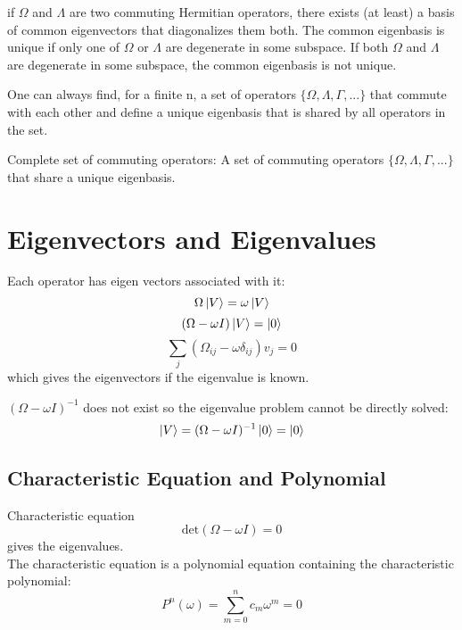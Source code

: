 \begin{theorem}
	if $\Omega$ and $\Lambda$ are two commuting Hermitian operators, there exists (at least) a basis of common eigenvectors that 
	diagonalizes them both.  The common eigenbasis is unique if only one of $\Omega$ or $\Lambda$ are degenerate in some subspace.  
	If both $\Omega$ and $\Lambda$ are	degenerate in some subspace, the common eigenbasis is not unique.
\end{theorem}

\begin{theorem}
	One can always find, for a finite n, a set of operators $\{\Omega, \Lambda, \Gamma, ...\}$ that commute with each other and define
	a unique eigenbasis that is shared by all operators in the set.
\end{theorem}

\begin{definition}{Complete set of commuting operators:}
	A set of commuting operators $\{\Omega, \Lambda, \Gamma, ...\}$ that share a unique eigenbasis.
\end{definition}




\section{Eigenvectors and Eigenvalues}

Each operator has eigen vectors associated with it:
\begin{equation}
	\Omega\ket{V} = \omega \ket{V}
\end{equation}
\begin{equation}
	(\Omega - \omega I)\ket{V} = \ket{0}
\end{equation}
\begin{equation}
	\sum_j (\Omega_{ij}-\omega\delta_{ij})v_j = 0
\end{equation}
which gives the eigenvectors if the eigenvalue is known.

$(\Omega - \omega I)^{-1}$ does not exist so the eigenvalue problem cannot be directly solved:
\begin{equation}
	\ket{V} = (\Omega - \omega I)^{-1}\ket{0} = \ket{0}
\end{equation}

\subsection{Characteristic Equation and Polynomial}
Characteristic equation
\begin{equation}
	\text{det}(\Omega - \omega I) = 0
\end{equation}
gives the eigenvalues.
\\
The characteristic equation is a polynomial equation containing the characteristic polynomial:
\begin{equation}
	P^n(\omega) = \sum_{m=0}^{n} c_m \omega^m = 0
\end{equation}

